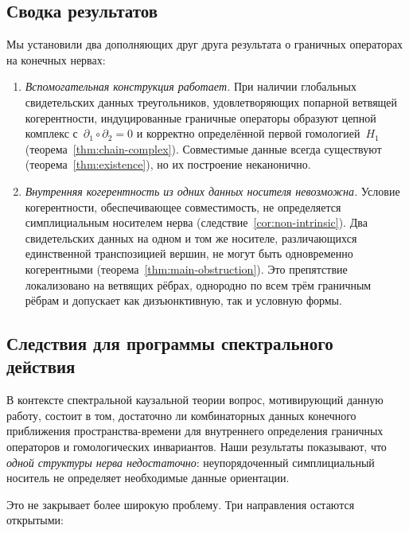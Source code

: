 \documentclass[11pt,a4paper]{article}
\theoremstyle{plain}
\theoremstyle{definition}
\theoremstyle{remark}
\begin{document}
\subsection{Сводка результатов}

Мы установили два дополняющих друг друга результата о граничных операторах
на конечных нервах:

\begin{enumerate}[nosep]
  \item \emph{Вспомогательная конструкция работает.}
    При наличии глобальных свидетельских данных треугольников,
    удовлетворяющих попарной ветвящей когерентности, индуцированные
    граничные операторы образуют цепной комплекс
    с~$\partial_1 \circ \partial_2 = 0$ и корректно определённой первой
    гомологией~$H_1$ (теорема~\ref{thm:chain-complex}).
    Совместимые данные всегда существуют (теорема~\ref{thm:existence}),
    но их построение неканонично.

  \item \emph{Внутренняя когерентность из одних данных носителя
    невозможна.}
    Условие когерентности, обеспечивающее совместимость, не определяется
    симплициальным носителем нерва
    (следствие~\ref{cor:non-intrinsic}).
    Два свидетельских данных на одном и том же носителе, различающихся
    единственной транспозицией вершин, не могут быть одновременно
    когерентными (теорема~\ref{thm:main-obstruction}).
    Это препятствие локализовано на ветвящих рёбрах, однородно по
    всем трём граничным рёбрам и допускает как дизъюнктивную, так и
    условную формы.
\end{enumerate}

\subsection{Следствия для программы спектрального действия}

В контексте спектральной каузальной теории вопрос, мотивирующий данную
работу, состоит в том, достаточно ли комбинаторных данных конечного
приближения пространства-времени для внутреннего определения граничных
операторов и гомологических инвариантов. Наши результаты показывают, что
\emph{одной структуры нерва недостаточно}: неупорядоченный симплициальный
носитель не определяет необходимые данные ориентации.

Это не закрывает более широкую проблему. Три направления остаются
открытыми:
\end{document}
